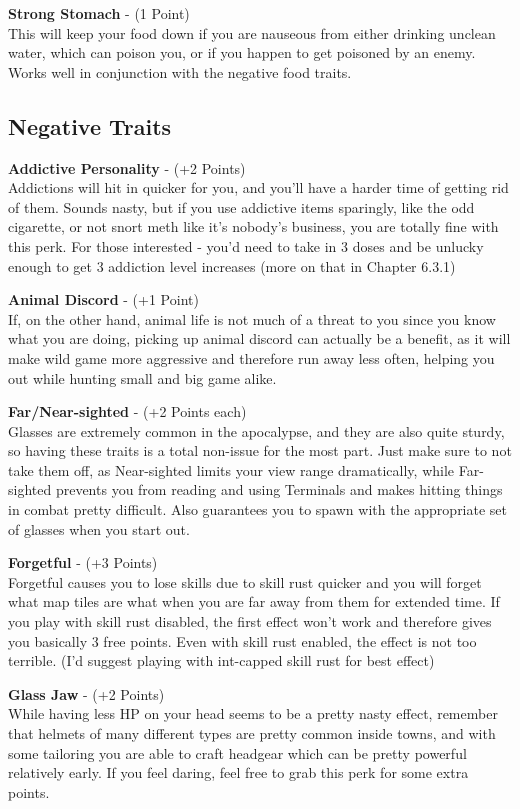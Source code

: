 \textbf{Strong Stomach} - (1 Point)\\This will keep your food down if you are nauseous from either drinking unclean water, which can poison you, or if you happen to get poisoned by an enemy. Works well in conjunction with the negative food traits.

\subsection{Negative Traits}

\textbf{Addictive Personality} - (+2 Points)\\Addictions will hit in quicker for you, and you'll have a harder time of getting rid of them. Sounds nasty, but if you use addictive items sparingly, like the odd cigarette, or not snort meth like it's nobody's business, you are totally fine with this perk. For those interested - you'd need to take in 3 doses and be unlucky enough to get 3 addiction level increases (more on that in Chapter 6.3.1)

\textbf{Animal Discord} - (+1 Point)\\If, on the other hand, animal life is not much of a threat to you since you know what you are doing, picking up animal discord can actually be a benefit, as it will make wild game more aggressive and therefore run away less often, helping you out while hunting small and big game alike.

\textbf{Far/Near-sighted} - (+2 Points each)\\Glasses are extremely common in the apocalypse, and they are also quite sturdy, so having these traits is a total non-issue for the most part. Just make sure to not take them off, as Near-sighted limits your view range dramatically, while Far-sighted prevents you from reading and using Terminals and makes hitting things in combat pretty difficult. Also guarantees you to spawn with the appropriate set of glasses when you start out.

\textbf{Forgetful} - (+3 Points)\\Forgetful causes you to lose skills due to skill rust quicker and you will forget what map tiles are what when you are far away from them for extended time. If you play with skill rust disabled, the first effect won't work and therefore gives you basically 3 free points. Even with skill rust enabled, the effect is not too terrible. (I'd suggest playing with int-capped skill rust for best effect)

\textbf{Glass Jaw} - (+2 Points)\\While having less HP on your head seems to be a pretty nasty effect, remember that helmets of many different types are pretty common inside towns, and with some tailoring you are able to craft headgear which can be pretty powerful relatively early. If you feel daring, feel free to grab this perk for some extra points.

